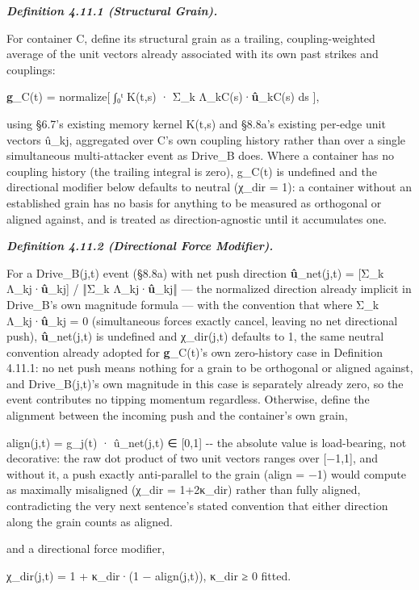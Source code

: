 \documentclass[
]{article}
\begin{document}
\emph{\textbf{Definition 4.11.1 (Structural Grain).}}

For container C, define its structural grain as a trailing,
coupling-weighted average of the unit vectors already associated with
its own past strikes and couplings:

\textbf{g}\_C(t) = normalize{[} ∫₀ᵗ K(t,s) · Σ\_k
Λ\_kC(s)·\textbf{û}\_kC(s) ds {]},

using §6.7's existing memory kernel K(t,s) and §8.8a's existing per-edge
unit vectors û\_kj, aggregated over C's own coupling history rather than
over a single simultaneous multi-attacker event as Drive\_B does. Where
a container has no coupling history (the trailing integral is zero),
g\_C(t) is undefined and the directional modifier below defaults to
neutral (χ\_dir = 1): a container without an established grain has no
basis for anything to be measured as orthogonal or aligned against, and
is treated as direction-agnostic until it accumulates one.

\emph{\textbf{Definition 4.11.2 (Directional Force Modifier).}}

For a Drive\_B(j,t) event (§8.8a) with net push direction
\textbf{û}\_net(j,t) = {[}Σ\_k Λ\_kj·\textbf{û}\_kj{]} / ‖Σ\_k
Λ\_kj·\textbf{û}\_kj‖ --- the normalized direction already implicit in
Drive\_B's own magnitude formula --- with the convention that where Σ\_k
Λ\_kj·\textbf{û}\_kj = 0 (simultaneous forces exactly cancel, leaving no
net directional push), \textbf{û}\_net(j,t) is undefined and χ\_dir(j,t)
defaults to 1, the same neutral convention already adopted for
\textbf{g}\_C(t)'s own zero-history case in Definition 4.11.1: no net
push means nothing for a grain to be orthogonal or aligned against, and
Drive\_B(j,t)'s own magnitude in this case is separately already zero,
so the event contributes no tipping momentum regardless. Otherwise,
define the alignment between the incoming push and the container's own
grain,

align(j,t) = \textbar g\_j(t) · û\_net(j,t)\textbar{} ∈ {[}0,1{]} -\/-
the absolute value is load-bearing, not decorative: the raw dot product
of two unit vectors ranges over {[}−1,1{]}, and without it, a push
exactly anti-parallel to the grain (align = −1) would compute as
maximally misaligned (χ\_dir = 1+2κ\_dir) rather than fully aligned,
contradicting the very next sentence's stated convention that either
direction along the grain counts as aligned.

and a directional force modifier,

χ\_dir(j,t) = 1 + κ\_dir·(1 − align(j,t)), κ\_dir ≥ 0 fitted.
\end{document}
